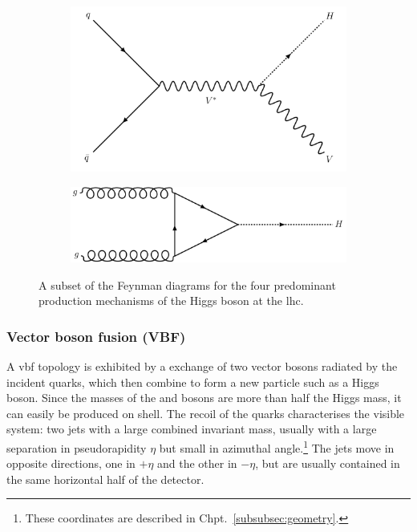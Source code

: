 \begin{figure}[htbp]
    \begin{subfigure}[b]{0.45\textwidth}
        \includegraphics[width=\textwidth]{figures/feynman_diagrams/VH.png}
        \caption{\VH}
    \end{subfigure}
    \hfill
    \begin{subfigure}[b]{0.45\textwidth}
        \includegraphics[width=\textwidth]{figures/feynman_diagrams/ggF.png}
        \caption{\ggH}
    \end{subfigure}
\caption[A subset of the Feynman diagrams for the four predominant production mechanisms of the Higgs boson at the LHC]{A subset of the Feynman diagrams for the four predominant production mechanisms of the Higgs boson at the \acrshort{lhc}.}
\label{fig:higgs_feynman_diagrams}
\end{figure}




\subsubsection{Vector boson fusion (VBF)}
\label{subsubsec:theory_hinv_VBF_mode}

A \acrshort{vbf} topology is exhibited by a \tchannel exchange of two vector bosons radiated by the incident quarks, which then combine to form a new particle such as a Higgs boson. Since the masses of the \PW and \PZ bosons are more than half the Higgs mass, it can easily be produced on shell. The recoil of the quarks characterises the visible system: two \glspl{jet} with a large combined invariant mass, usually with a large separation in pseudorapidity $\eta$ but small in azimuthal angle.\footnote{These coordinates are described in Chpt.~\ref{subsubsec:geometry}.} The \glspl{jet} move in opposite directions, one in $+\eta$ and the other in $-\eta$, but are usually contained in the same horizontal half of the detector.



